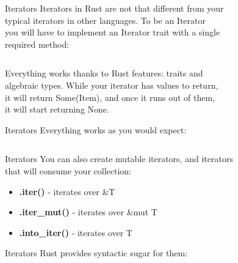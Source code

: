 \documentclass[usenames,dvipsnames,10pt,aspectratio=169]{beamer}
\begin{document}
\begin{frame}{Iterators}
	\large
	Iterators in Rust are not that different from your\\
	typical iterators in other languages. To be an Iterator\\
	you will have to implement an Iterator trait with a single\\
	required method:\\
	\vspace{0.3cm}
	\inputminted[fontsize=\large]{rust}{code/iterators1.rs}
	\vspace{0.3cm}
	Everything works thanks to Rust features: traits and\\
	algebraic types. While your iterator has values to return,\\
	it will return \textcolor{ucuyellow}{Some(Item)}, and once it runs out of them,\\
	it will start returning \textcolor{ucuyellow}{None}.
\end{frame}

\begin{frame}{Iterators}
	\large
	Everything works as you would expect:\\
	\vspace{0.3cm}
	\inputminted[fontsize=\large]{rust}{code/iterators2.rs}
\end{frame}

\begin{frame}{Iterators}
	\large
	You can also create mutable iterators, and iterators\\
	that will consume your collection:
	\vspace{0.3cm}
\begin{itemize}[label=$\bullet$]
	\item \textbf{.iter()} - iterates over \textcolor{ucuyellow}{\&T} \\
	\item \textbf{.iter\_mut()} - iterates over \textcolor{ucuyellow}{\&mut T}\\
	\item \textbf{.into\_iter()} - iterates over \textcolor{ucuyellow}{T}\\
\end{itemize}
\end{frame}

\begin{frame}{Iterators}
	Rust provides syntactic sugar for them:\\
	\vspace{0.3cm}
	\inputminted[fontsize=\Large]{rust}{code/iterators3.rs}
\end{frame}
\end{document}
